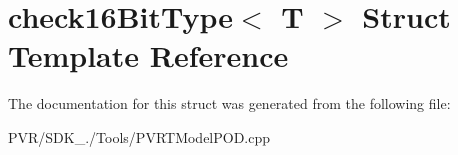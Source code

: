 \hypertarget{structcheck16_bit_type}{\section{check16\+Bit\+Type$<$ T $>$ Struct Template Reference}
\label{structcheck16_bit_type}
}


The documentation for this struct was generated from the following file\+:\begin{DoxyCompactItemize}
\item 
P\+V\+R/\+S\+D\+K\+\_./\+Tools/P\+V\+R\+T\+Model\+P\+O\+D.\+cpp\end{DoxyCompactItemize}
